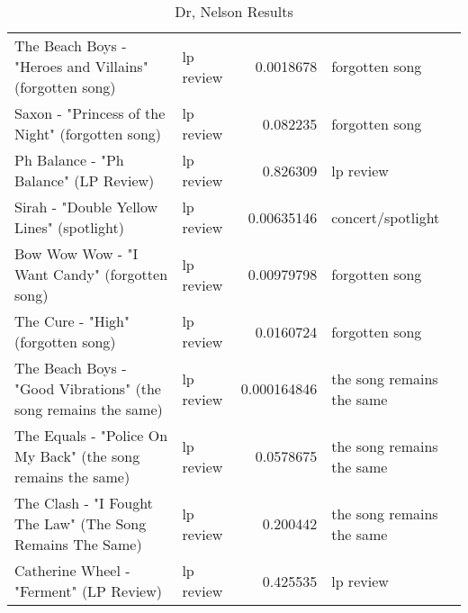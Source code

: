 \documentclass[letterpaper,10pt]{article}
\begin{document}
\begin{table}[H]
\begin{adjustbox}{max width=\linewidth}
\begin{tabular}{llrl}
 The Beach Boys - "Heroes and Villains" (forgotten song)                          & lp review                 &  0.0018678   & forgotten song            \\
 Saxon - "Princess of the Night" (forgotten song)                                 & lp review                 &  0.082235    & forgotten song            \\
 Ph Balance - "Ph Balance" (LP Review)                                            & lp review                 &  0.826309    & lp review                 \\
 Sirah - "Double Yellow Lines" (spotlight)                                        & lp review                 &  0.00635146  & concert/spotlight         \\
 Bow Wow Wow - "I Want Candy" (forgotten song)                                    & lp review                 &  0.00979798  & forgotten song            \\
 The Cure - "High" (forgotten song)                                               & lp review                 &  0.0160724   & forgotten song            \\
 The Beach Boys - "Good Vibrations" (the song remains the same)                   & lp review                 &  0.000164846 & the song remains the same \\
 The Equals - "Police On My Back" (the song remains the same)                     & lp review                 &  0.0578675   & the song remains the same \\
 The Clash - "I Fought The Law" (The Song Remains The Same)                       & lp review                 &  0.200442    & the song remains the same \\
 Catherine Wheel - "Ferment" (LP Review)                                          & lp review                 &  0.425535    & lp review                 \\
\hline
\end{tabular}
\end{adjustbox}
\caption{Dr, Nelson Results}
  \label{tab:dnresults}
\end{table}
\end{document}
